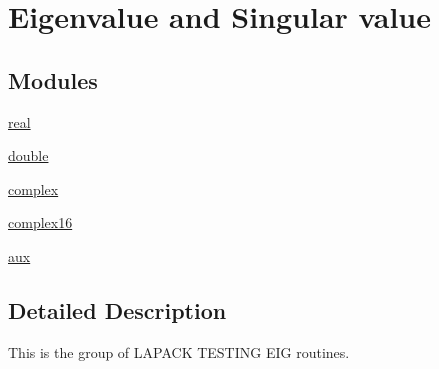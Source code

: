 \hypertarget{group__eig}{}\section{Eigenvalue and Singular value}
\label{group__eig}
\subsection*{Modules}
\begin{DoxyCompactItemize}
\item 
\hyperlink{group__single__eig}{real}
\item 
\hyperlink{group__double__eig}{double}
\item 
\hyperlink{group__complex__eig}{complex}
\item 
\hyperlink{group__complex16__eig}{complex16}
\item 
\hyperlink{group__aux__eig}{aux}
\end{DoxyCompactItemize}


\subsection{Detailed Description}
This is the group of L\+A\+P\+A\+C\+K T\+E\+S\+T\+I\+N\+G E\+I\+G routines. 